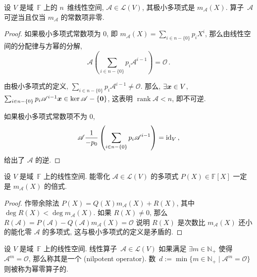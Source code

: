 \documentclass[openany, a5paper, oneside]{ctexbook}
\DeclareMathOperator{\rank}{rank}
\begin{document}
\begin{theorem}[可逆算子与极小多项式的常数项]
	设 $V$ 是域~$\mathbb F$ 上的 $n$~维线性空间, $\mathscr A \in \mathcal L(V)$, 其极小多项式是 $m_\mathscr A (X)$. 
	算子~$\mathscr A$ 可逆当且仅当 $m_\mathscr A$ 的常数项非零.
\end{theorem}
\begin{proof}
	如果极小多项式常数项为 $0$, 即 $m_\mathscr A(X) = \sum_{i \in n - \{0\}} p_i X^i$, 那么由线性空间的分配律与方幂的分解,
	\begin{equation*}
		\mathscr A 
		\left(
			\sum_{i \in n - \{0\}} p_i \mathscr A^{i - 1}
		\right) = \mathscr O\,.
	\end{equation*}

	由极小多项式的定义, $\sum_{i \in n - \{0\}} p_i \mathscr A^{i - 1} \neq \mathscr O$. 
	那么, $\exists \boldsymbol{x} \in V$, $\sum_{i \in n - \{0\}} p_i \mathscr A^{i - 1} \boldsymbol{x} \in \ker \mathscr A - \{\boldsymbol{0}\}$, 这表明 $\rank \mathscr A < n$, 即不可逆. 

	如果极小多项式常数项不为 $0$, 
	\begin{equation*}
		\mathscr A \frac{1}{- p_0} 
		\left(
			\sum_{i \in n - \{0\}} p_i \mathscr A^{i - 1}
		\right) = \operatorname{id}_V\,,
	\end{equation*}
	给出了 $\mathscr A$ 的逆.
\end{proof}

\begin{theorem}[化零算子的多项式是极小多项式的倍式]
	设 $V$ 是域~$\mathbb F$ 上的线性空间.
	能零化 $\mathscr A \in \mathcal L (V)$ 的多项式 $P(X) \in \mathbb F[X]$ 一定是 $m_\mathscr A (X)$ 的倍式.
\end{theorem}
\begin{proof}
	作带余除法 $P(X) = Q(X) m_\mathscr A(X) + R(X)$, 其中 $\deg R(X) < \deg m_\mathscr A(X)$. 
	如果 $R(X) \neq 0$, 那么 $R(\mathscr A) = P(\mathscr A) - Q(\mathscr A) m_\mathscr A(X) = \mathscr O$ 说明 $R(X)$ 是次数比 $m_\mathscr A(X)$ 还小的能化零 $\mathscr A$ 的多项式, 这与极小多项式的定义是矛盾的.
\end{proof}

\begin{definition}[幂零算子]
	设 $V$ 是域~$\mathbb F$ 上的线性空间.
	线性算子~$\mathscr A \in \mathcal L(V)$ 如果满足 $\exists m \in \mathbb N_+$ 使得 $\mathscr A^m = \mathscr O$, 那么称其是一个 (nilpotent operator). 
	数~$d := \min \{m \in \mathbb N_+ \mid \mathscr A^m = \mathscr O\}$ 则被称为幂零算子的.
\end{definition}
\end{document}
